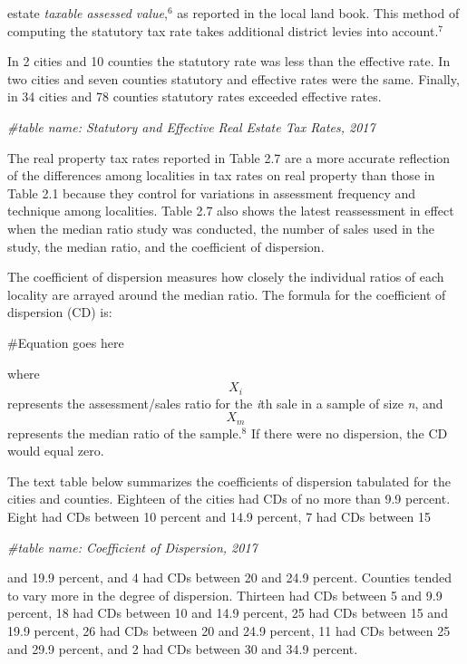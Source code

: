 \documentclass[
]{book}
\newenvironment{Shaded}{\begin{snugshade}}{\end{snugshade}}
\newcommand{\CommentTok}[1]{\textcolor[rgb]{0.56,0.35,0.01}{\textit{#1}}}
\begin{document}
estate \emph{taxable assessed value},\(^6\) as reported in the local land book. This method of computing the statutory tax rate takes additional district levies into account.\(^7\)

In 2 cities and 10 counties the statutory rate was less than the effective rate. In two cities and seven counties statutory and effective rates were the same. Finally, in 34 cities and 78 counties statutory rates exceeded effective rates.

\begin{Shaded}
\begin{Highlighting}[]
\CommentTok{\#table name: Statutory and Effective Real Estate Tax Rates, 2017}
\end{Highlighting}
\end{Shaded}

The real property tax rates reported in Table 2.7 are a more accurate reflection of the differences among localities in tax rates on real property than those in Table 2.1 because they control for variations in assessment frequency and technique among localities. Table 2.7 also shows the latest reassessment in effect when the median ratio study was conducted, the number of sales used in the study, the median ratio, and the coefficient of dispersion.

The coefficient of dispersion measures how closely the individual ratios of each locality are arrayed around the median ratio. The formula for the coefficient of dispersion (CD) is:

\#Equation goes here

where \[X_i\] represents the assessment/sales ratio for the \emph{i}th sale in a sample of size \emph{n}, and \[X_m\] represents the median ratio of the sample.\(^8\) If there were no dispersion, the CD would equal zero.

The text table below summarizes the coefficients of dispersion tabulated for the cities and counties. Eighteen of the cities had CDs of no more than 9.9 percent. Eight had CDs between 10 percent and 14.9 percent, 7 had CDs between 15

\begin{Shaded}
\begin{Highlighting}[]
\CommentTok{\#table name: Coefficient of Dispersion, 2017}
\end{Highlighting}
\end{Shaded}

and 19.9 percent, and 4 had CDs between 20 and 24.9 percent. Counties tended to vary more in the degree of dispersion. Thirteen had CDs between 5 and 9.9 percent, 18 had CDs between 10 and 14.9 percent, 25 had CDs between 15 and 19.9 percent, 26 had CDs between 20 and 24.9 percent, 11 had CDs between 25 and 29.9 percent, and 2 had CDs between 30 and 34.9 percent.
\end{document}
